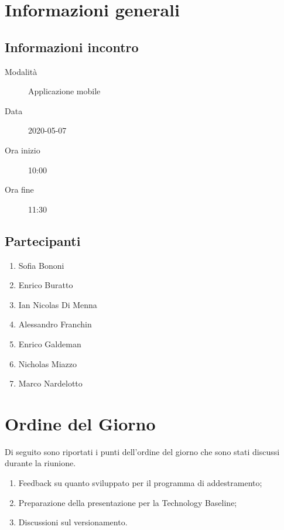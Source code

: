 \documentclass{article}
\begin{document}


\section{Informazioni generali}%
\label{sec:informazioni_generali}

\subsection{Informazioni incontro}%
\label{sub:informazioni_incontro}

\begin{description}
  \item[Modalità] Applicazione mobile 
  \item[Data] 2020-05-07
  \item[Ora inizio] 10:00
  \item[Ora fine] 11:30
\end{description}

\subsection{Partecipanti}%
\label{sub:partecipanti}

\begin{enumerate}
  \item Sofia Bononi
  \item Enrico Buratto
  \item Ian Nicolas Di Menna
  \item Alessandro Franchin
  \item Enrico Galdeman
  \item Nicholas Miazzo
  \item Marco Nardelotto
\end{enumerate}

\section{Ordine del Giorno}%
\label{ordine_del_giorno}
Di seguito sono riportati i punti dell'ordine del giorno che sono stati discussi durante la riunione.
\begin{enumerate}
  \item Feedback su quanto sviluppato per il programma di addestramento;
  \item Preparazione della presentazione per la Technology Baseline;
  \item Discussioni sul versionamento.
\end{enumerate}
\end{document}
